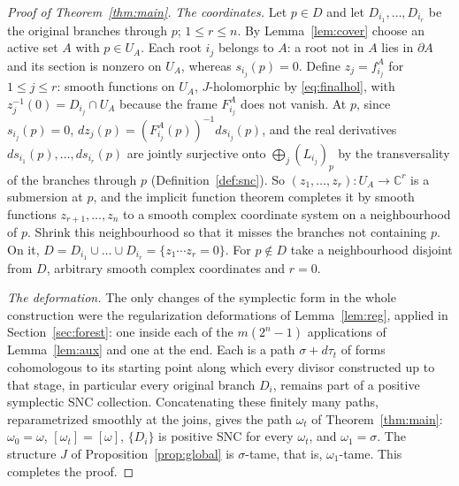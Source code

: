\documentclass[11pt]{article}
\theoremstyle{remark}
\newcommand{\C}{\mathbb C}
\begin{document}
\begin{proof}[Proof of Theorem~\ref{thm:main}]
\emph{The coordinates.} Let $p\in D$ and let $D_{i_1},\dots,D_{i_r}$
be the original branches through $p$; $1\le r\le n$. By
Lemma~\ref{lem:cover} choose an active set $A$ with $p\in U_A$. Each
root $i_j$ belongs to $A$: a root not in $A$ lies in $\partial A$ and
its section is nonzero on $U_A$, whereas $s_{i_j}(p)=0$. Define
$z_j=f^A_{i_j}$ for $1\le j\le r$: smooth functions on $U_A$,
$J$-holomorphic by \eqref{eq:finalhol}, with $z_j^{-1}(0)=D_{i_j}\cap U_A$
because the frame $F^A_{i_j}$ does not vanish. At $p$, since
$s_{i_j}(p)=0$, $dz_j(p)=(F^A_{i_j}(p))^{-1}ds_{i_j}(p)$, and the real
derivatives $ds_{i_1}(p),\dots,ds_{i_r}(p)$ are jointly surjective onto
$\bigoplus_j(L_{i_j})_p$ by the transversality of the branches through
$p$ (Definition~\ref{def:snc}). So $(z_1,\dots,z_r)\colon U_A\to\C^r$
is a submersion at $p$, and the implicit function theorem completes it
by smooth functions $z_{r+1},\dots,z_n$ to a smooth complex coordinate
system on a neighbourhood of $p$. Shrink this
neighbourhood so that it misses the branches not containing $p$. On it,
$D=D_{i_1}\cup\dots\cup D_{i_r}=\{z_1\cdots z_r=0\}$. For $p\notin D$
take a neighbourhood disjoint from $D$, arbitrary smooth complex
coordinates and $r=0$.

\emph{The deformation.} The only changes of the symplectic form in the
whole construction were the regularization deformations of
Lemma~\ref{lem:reg}, applied in Section~\ref{sec:forest}: one inside
each of the $m(2^n-1)$ applications of Lemma~\ref{lem:aux} and one at
the end. Each is a path $\sigma+d\tau_t$ of forms cohomologous to its
starting point along which every divisor constructed up to that stage,
in particular every original branch $D_i$, remains part of a positive
symplectic SNC collection. Concatenating these finitely many paths,
reparametrized smoothly at the joins, gives the path $\omega_t$ of
Theorem~\ref{thm:main}: $\omega_0=\omega$, $[\omega_t]=[\omega]$,
$\{D_i\}$ is positive SNC for every $\omega_t$, and $\omega_1=\sigma$.
The structure $J$ of Proposition~\ref{prop:global} is $\sigma$-tame,
that is, $\omega_1$-tame. This completes the proof.
\end{proof}
\end{document}
